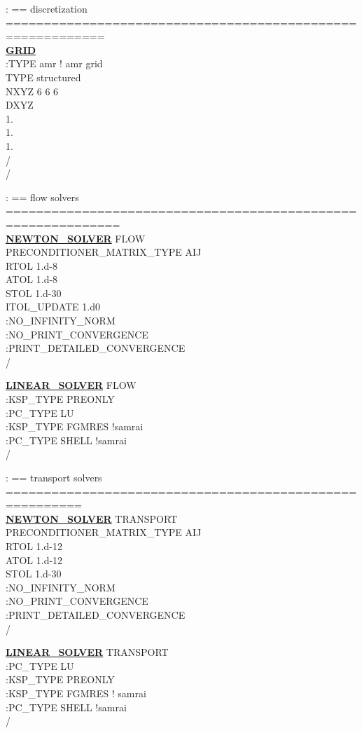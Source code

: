\documentclass[12pt]{article}
\begin{document}
\noindent
: == discretization ===========================================================\\
\hyperlink{target_grid}{\bf GRID}\\
:TYPE amr ! amr grid\\
TYPE structured\\
NXYZ 6 6 6\\
DXYZ\\
1.\\
1.\\
1.\\
/\\
/

\noindent
: == flow solvers =============================================================\\
\hyperlink{target_newt}{\bf NEWTON\_SOLVER} FLOW\\
PRECONDITIONER\_MATRIX\_TYPE AIJ\\
RTOL 1.d-8\\
ATOL 1.d-8\\
STOL 1.d-30\\
ITOL\_UPDATE 1.d0\\
:NO\_INFINITY\_NORM\\
:NO\_PRINT\_CONVERGENCE\\
:PRINT\_DETAILED\_CONVERGENCE\\
/

\noindent
\hyperlink{target_linsolv}{\bf LINEAR\_SOLVER} FLOW\\
:KSP\_TYPE PREONLY\\
:PC\_TYPE LU\\
:KSP\_TYPE FGMRES !samrai\\
:PC\_TYPE SHELL !samrai\\
/

\noindent
: == transport solvers ========================================================\\
\hyperlink{target_newt}{\bf NEWTON\_SOLVER} TRANSPORT\\
PRECONDITIONER\_MATRIX\_TYPE AIJ\\
RTOL 1.d-12\\
ATOL 1.d-12\\
STOL 1.d-30\\
:NO\_INFINITY\_NORM\\
:NO\_PRINT\_CONVERGENCE\\
:PRINT\_DETAILED\_CONVERGENCE\\
/

\noindent
\hyperlink{target_linsolv}{\bf LINEAR\_SOLVER} TRANSPORT\\
:PC\_TYPE LU\\
:KSP\_TYPE PREONLY\\
:KSP\_TYPE FGMRES ! samrai\\
:PC\_TYPE SHELL !samrai\\
/
\end{document}
